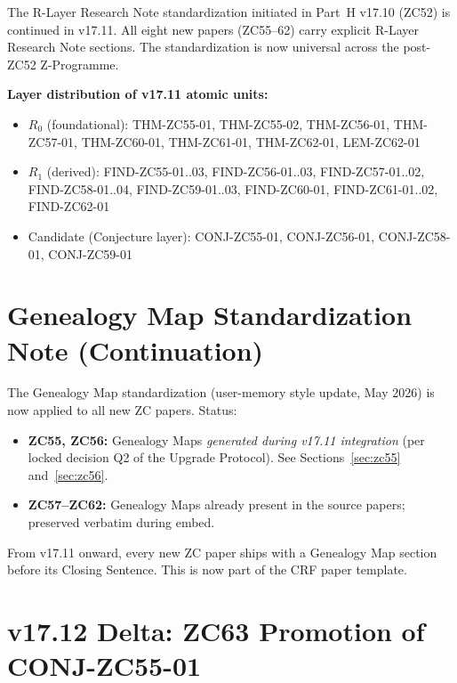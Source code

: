 \documentclass[12pt, a4paper]{article}
\begin{document}
\begin{layerbox}[title={R-Layer Standardization --- v17.11 Continuation}]
The R-Layer Research Note standardization initiated in Part~H v17.10
(ZC52) is continued in v17.11. All eight new papers (ZC55--62) carry
explicit R-Layer Research Note sections. The standardization is now
universal across the post-ZC52 Z-Programme.

\medskip
\textbf{Layer distribution of v17.11 atomic units:}
\begin{itemize}[leftmargin=1.5em]
\item $R_0$ (foundational): THM-ZC55-01, THM-ZC55-02, THM-ZC56-01,
  THM-ZC57-01, THM-ZC60-01, THM-ZC61-01, THM-ZC62-01, LEM-ZC62-01
\item $R_1$ (derived): FIND-ZC55-01..03, FIND-ZC56-01..03,
  FIND-ZC57-01..02, FIND-ZC58-01..04, FIND-ZC59-01..03,
  FIND-ZC60-01, FIND-ZC61-01..02, FIND-ZC62-01
\item Candidate (Conjecture layer): CONJ-ZC55-01, CONJ-ZC56-01,
  CONJ-ZC58-01, CONJ-ZC59-01
\end{itemize}
\end{layerbox}

\section{Genealogy Map Standardization Note (Continuation)}
\label{sec:xlii-genealogy}

\begin{genealogybox}[title={Genealogy Map Standardization --- v17.11 Status}]
The Genealogy Map standardization (user-memory style update, May 2026)
is now applied to all new ZC papers. Status:

\medskip
\begin{itemize}[leftmargin=1.5em]
\item \textbf{ZC55, ZC56:} Genealogy Maps \emph{generated during v17.11
  integration} (per locked decision Q2 of the Upgrade Protocol).
  See Sections~\ref{sec:zc55} and~\ref{sec:zc56}.
\item \textbf{ZC57--ZC62:} Genealogy Maps already present in the source
  papers; preserved verbatim during embed.
\end{itemize}

\medskip
From v17.11 onward, every new ZC paper ships with a Genealogy Map
section before its Closing Sentence. This is now part of the CRF
paper template.
\end{genealogybox}

\section{v17.12 Delta: ZC63 Promotion of CONJ-ZC55-01}
\label{sec:xliii-v1712-delta}
\end{document}
